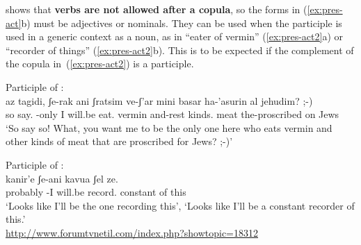 \begin{exe}
\begin{xlist}
\begin{exe}
\begin{xlist}
\begin{exe}
\begin{exe}
\begin{xlist}
\begin{exe}
\begin{exe}
\begin{xlist}
\begin{exe}
\begin{xlist}
\begin{exe}
\begin{xlist}
\begin{exe}
\begin{xlist}
\begin{exe}
\begin{xlist}
\begin{xlist}
\begin{exe}
\begin{xlist}
\begin{exe}
\begin{xlist}
\begin{exe}
\begin{exe}
\begin{exe}
\begin{xlist}
\begin{exe}
\begin{exe}
\begin{xlist}
\begin{exe}
\begin{xlist}
 \z
\z 
\cite{doron00} shows that \textbf{verbs are not allowed after a copula}, so the forms in (\ref{ex:pres-act}b) must be adjectives or nominals. They can be used when the participle is used in a generic context as a noun, as in ``eater of vermin'' (\ref{ex:pres-act2}a) or ``recorder of things'' (\ref{ex:pres-act2}b). This is to be expected if the complement of the copula in~(\ref{ex:pres-act2}) is a participle.
 \begin{exe}
 \ex  \label{ex:pres-act2} 
 \begin{xlist} 
  \ex  Participle of {\tkal}: \\
	{ \gll az tagidi, ʃe-rak ani   ʃratsim ve-ʃ'ar mini basar ha-'asurin al jehudim? ;-)\\
        so say. -only I will.be eat. vermin and-rest kinds. meat the-proscribed on Jews\\
      \glt `So say so! What, you want me to be the only one here who eats vermin and other kinds of meat that are proscribed for Jews? ;-)'\footnotemark } 
 

  \ex  Participle of {\thif}: \\
 	{ \gll kanir'e ʃe-ani   kavua ʃel ze.\\
        probably -I will.be record. constant of this\\
      \glt `Looks like I'll be the one recording this', `Looks like I'll be a constant recorder of this.'\\
        \url{http://www.forumtvnetil.com/index.php?showtopic=18312} } 
 
 \z
\z 


\end{xlist}
\end{exe}
\end{xlist}
\end{exe}
\end{xlist}
\end{exe}
\end{exe}
\end{xlist}
\end{exe}
\end{exe}
\end{exe}
\end{xlist}
\end{exe}
\end{xlist}
\end{exe}
\end{xlist}
\end{xlist}
\end{exe}
\end{xlist}
\end{exe}
\end{xlist}
\end{exe}
\end{xlist}
\end{exe}
\end{xlist}
\end{exe}
\end{exe}
\end{xlist}
\end{exe}
\end{exe}
\end{xlist}
\end{exe}
\end{xlist}
\end{exe}
